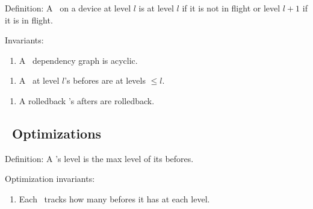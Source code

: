 


\noindent Definition: A \chdesc\ on a device at level $l$ is at level $l$
if it is not in flight or level $l+1$ if it is in flight.

\newcommand{\chdescinvar}[1]{\begin{enumerate}\setcounter{enumi}{\value{chdescinvari}}\item #1\setcounter{chdescinvari}{\value{enumi}}\end{enumerate}}

\noindent Invariants:
\chdescinvar{A \chdesc\ dependency graph is acyclic.}

\chdescinvar{A \chdesc\ at level $l$'s befores are at levels $\leq l$.}

\chdescinvar{A rolledback \chdesc{}'s afters are rolledback.}

\subsection{\ChDesc\ Optimizations}

Definition: A \noop{}'s level is the max level of its befores.

\noindent Optimization invariants:
\chdescinvar{Each \chdesc\ tracks how many befores it has at each level.}

